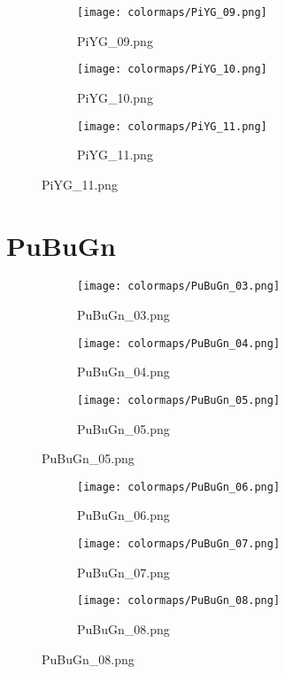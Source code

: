 \documentclass{article}%
\begin{document}
%
\hspace{1cm}\hfill%
\hspace{1cm}\hfill%
\hspace{1cm}\hfill%


\begin{figure}[h!]%
\begin{subfigure}[b]{0.3\linewidth}%
\texttt{[image: colormaps/PiYG\_09.png]}%
\caption{PiYG\_09.png}%
\end{subfigure}%
\begin{subfigure}[b]{0.3\linewidth}%
\texttt{[image: colormaps/PiYG\_10.png]}%
\caption{PiYG\_10.png}%
\end{subfigure}%
\begin{subfigure}[b]{0.3\linewidth}%
\texttt{[image: colormaps/PiYG\_11.png]}%
\caption{PiYG\_11.png}%
\end{subfigure}%
\end{figure}

%
\newpage%
\section{PuBuGn}%
\label{sec:PuBuGn}%
\hspace{1cm}\hfill%
\hspace{1cm}\hfill%
\hspace{1cm}\hfill%


\begin{figure}[h!]%
\begin{subfigure}[b]{0.3\linewidth}%
\texttt{[image: colormaps/PuBuGn\_03.png]}%
\caption{PuBuGn\_03.png}%
\end{subfigure}%
\begin{subfigure}[b]{0.3\linewidth}%
\texttt{[image: colormaps/PuBuGn\_04.png]}%
\caption{PuBuGn\_04.png}%
\end{subfigure}%
\begin{subfigure}[b]{0.3\linewidth}%
\texttt{[image: colormaps/PuBuGn\_05.png]}%
\caption{PuBuGn\_05.png}%
\end{subfigure}%
\end{figure}

%
\hspace{1cm}\hfill%
\hspace{1cm}\hfill%
\hspace{1cm}\hfill%


\begin{figure}[h!]%
\begin{subfigure}[b]{0.3\linewidth}%
\texttt{[image: colormaps/PuBuGn\_06.png]}%
\caption{PuBuGn\_06.png}%
\end{subfigure}%
\begin{subfigure}[b]{0.3\linewidth}%
\texttt{[image: colormaps/PuBuGn\_07.png]}%
\caption{PuBuGn\_07.png}%
\end{subfigure}%
\begin{subfigure}[b]{0.3\linewidth}%
\texttt{[image: colormaps/PuBuGn\_08.png]}%
\caption{PuBuGn\_08.png}%
\end{subfigure}%
\end{figure}
\end{document}
